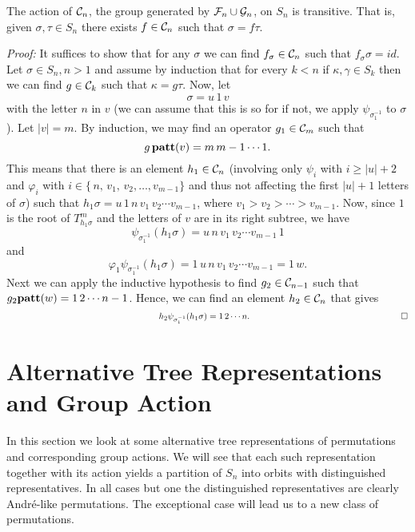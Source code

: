 \begin{theorem}  The action of ${\cal C}_n$, the group generated by ${\cal F}_n \cup {\cal G}_n$, on $S_n$ is transitive.  That is, given $\sigma, \tau \in S_n$ there
exists $f \in {\cal C}_n$ such that $\sigma = f \tau$.
\end{theorem}

{\em Proof:} It  suffices to show that for any $\sigma$ we can find $f_\sigma \in {\cal C}_n$ such that $f_\sigma \sigma = id$.
Let $\sigma \in S_n, n > 1$ and assume by induction that for every $k < n$
if $\kappa, \gamma \in S_k$ then we can find $g \in {\cal C}_k$ such 
that $\kappa = g \tau$.
Now, let
$$
\sigma = u \, 1 \,v$$
with the letter $n$ in $v$ (we can assume that this is so for if not, we apply
$\psi_{\sigma_1^{-1}}$ to $\sigma$).
Let $|v| = m$. By induction, we may find an operator $g_1 \in {\cal C}_m$
such that $$g \,{\bf patt}(v) = m\, m-1 \cdots 1.$$  This means that there is an 
element $h_1 \in {\cal C}_n$ (involving only $\psi_i$ with $i \ge |u|+2$ and
$\varphi_i$ with $ i \in \{ \, n ,\,v_1, \, v_2, \ldots, v_{m-1}\}$ and thus not
affecting the first $|u|+1$ letters of $\sigma$) such that $h_1 \sigma = u \, 1 \, n \,v_1 \, v_2 \cdots v_{m-1}$, where
$v_1 > v_2 > \cdots >v_{m-1}$.
Now, since $1$ is the root of $T_{h_1 \sigma}^m$ and the letters 
of $v$ are in its right subtree, we have 
$$\psi_{\sigma_1^{-1}} (h_1 \sigma) = u \,n \, v_1 \, v_2 \cdots  v_{m-1} \,1$$
and $$\varphi_1 \psi_{\sigma_1^{-1}} (h_1 \sigma)
= 1\, u \,n \, v_1 \, v_2 \cdots v_{m-1} = 1\, w.$$
Next we can apply the inductive hypothesis to find $g_2 \in {\cal C}_{n-1}$
such that $g_2 {\bf patt}(w) = 1\,2\cdots n-1$.  Hence, we can find an element
$h_2 \in {\cal C}_n$ that gives
$$ \hspace*{6.1105 cm}
h_2 \psi_{\sigma_1^{-1}} (h_1 \sigma) = 
1\,2 \cdots n.  \hspace*{6.1105 cm} \Box$$ 


\section{Alternative Tree Representations and Group Action}
\label{s_alt}

In this section we look at some alternative tree representations of 
permutations and corresponding group actions.  We will see that each such
representation together with its action yields a partition
of $S_n$ into orbits with distinguished representatives. In all
cases but one the distinguished representatives are clearly Andr\'e-like
permutations. The exceptional case will lead us to a new class of
permutations. 


